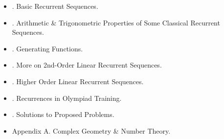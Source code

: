 \documentclass{article}
\begin{document}
\begin{itemize}
	\item {. Basic Recurrent Sequences.}
	\item {. Arithmetic \& Trigonometric Properties of Some Classical Recurrent Sequences.}
	\item {. Generating Functions.}
	\item {. More on 2nd-Order Linear Recurrent Sequences.}
	\item {. Higher Order Linear Recurrent Sequences.}
	\item {. Recurrences in Olympiad Training.}
	\item {. Solutions to Proposed Problems.}
	\item {\sf Appendix A. Complex Geometry \& Number Theory.}
\end{itemize}

\end{document}
